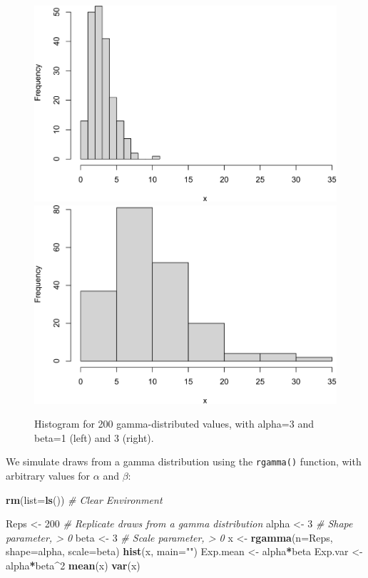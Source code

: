 \documentclass[
]{krantz}
\makeatletter
\newenvironment{Shaded}{\begin{snugshade}}{\end{snugshade}}
\newcommand{\AttributeTok}[1]{\textcolor[rgb]{0.27,0.27,0.27}{#1}}
\newcommand{\CommentTok}[1]{\textcolor[rgb]{0.37,0.37,0.37}{\textit{#1}}}
\newcommand{\DecValTok}[1]{\textcolor[rgb]{0.06,0.06,0.06}{#1}}
\newcommand{\FunctionTok}[1]{\textcolor[rgb]{0.27,0.27,0.27}{\textbf{#1}}}
\newcommand{\NormalTok}[1]{#1}
\newcommand{\OtherTok}[1]{\textcolor[rgb]{0.37,0.37,0.37}{#1}}
\newcommand{\SpecialCharTok}[1]{\textcolor[rgb]{0.43,0.43,0.43}{\textbf{#1}}}
\newcommand{\StringTok}[1]{\textcolor[rgb]{0.5,0.5,0.5}{#1}}
\newenvironment{kframe}{%
\medskip{}
\setlength{\fboxsep}{.8em}
 \def\at@end@of@kframe{}%
 \ifinner\ifhmode%
  \def\at@end@of@kframe{\end{minipage}}%
  \begin{minipage}{\columnwidth}%
 \fi\fi%
 \def\FrameCommand##1{\hskip\@totalleftmargin \hskip-\fboxsep
 \colorbox{shadecolor}{##1}\hskip-\fboxsep
     \hskip-\linewidth \hskip-\@totalleftmargin \hskip\columnwidth}%
 \MakeFramed {\advance\hsize-\width
   \@totalleftmargin\z@ \linewidth\hsize
   \@setminipage}}%
 {\par\unskip\endMakeFramed%
 \at@end@of@kframe}
\renewenvironment{Shaded}{\begin{kframe}}{\end{kframe}}
\makeatother
\begin{document}
\begin{figure}
\includegraphics[width=0.5\linewidth]{bookdown_files/figure-latex/Gamma-1} \includegraphics[width=0.5\linewidth]{bookdown_files/figure-latex/Gamma-2} \caption{Histogram for 200 gamma-distributed values, with alpha=3 and beta=1  (left) and 3 (right).}\label{fig:Gamma}
\end{figure}

We simulate draws from a gamma distribution using the \texttt{rgamma()} function, with arbitrary values for \(\alpha\) and \(\beta\):

\begin{Shaded}
\begin{Highlighting}[]
\FunctionTok{rm}\NormalTok{(}\AttributeTok{list=}\FunctionTok{ls}\NormalTok{()) }\CommentTok{\# Clear Environment}

\NormalTok{Reps }\OtherTok{\textless{}{-}} \DecValTok{200} \CommentTok{\# Replicate draws from a gamma distribution}
\NormalTok{alpha }\OtherTok{\textless{}{-}} \DecValTok{3} \CommentTok{\# Shape parameter, \textgreater{} 0}
\NormalTok{beta }\OtherTok{\textless{}{-}} \DecValTok{3} \CommentTok{\# Scale parameter, \textgreater{} 0}
\NormalTok{x }\OtherTok{\textless{}{-}} \FunctionTok{rgamma}\NormalTok{(}\AttributeTok{n=}\NormalTok{Reps, }\AttributeTok{shape=}\NormalTok{alpha, }\AttributeTok{scale=}\NormalTok{beta)}
\FunctionTok{hist}\NormalTok{(x, }\AttributeTok{main=}\StringTok{""}\NormalTok{)}
\NormalTok{Exp.mean }\OtherTok{\textless{}{-}}\NormalTok{ alpha}\SpecialCharTok{*}\NormalTok{beta}
\NormalTok{Exp.var }\OtherTok{\textless{}{-}}\NormalTok{ alpha}\SpecialCharTok{*}\NormalTok{beta}\SpecialCharTok{\^{}}\DecValTok{2}
\FunctionTok{mean}\NormalTok{(x)}
\FunctionTok{var}\NormalTok{(x)}
\end{Highlighting}
\end{Shaded}
\end{document}
